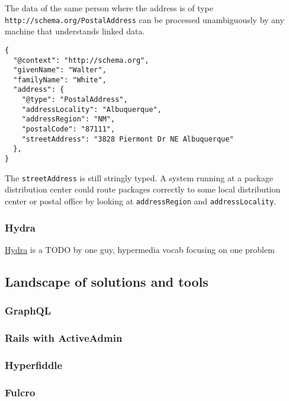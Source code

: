 The data of the same person where the address is of type \lstinline{http://schema.org/PostalAddress} can be processed unambiguously by any machine that understands linked data.

\lstset{language=JSON}
\begin{lstlisting}[caption=A person with an address of type PostalAddress]
{
  "@context": "http://schema.org",
  "givenName": "Walter",
  "familyName": "White",
  "address": {
    "@type": "PostalAddress",
    "addressLocality": "Albuquerque",
    "addressRegion": "NM",
    "postalCode": "87111",
    "streetAddress": "3828 Piermont Dr NE Albuquerque"
  },
}
\end{lstlisting}

The \lstinline{streetAddress} is still stringly typed. A system running at a package distribution center could route packages correctly to some local distribution center or postal office by looking at \lstinline{addressRegion} and \lstinline{addressLocality}.

\subsubsection{Hydra}

\href{http://www.hydra-cg.com/}{Hydra} is a
TODO by one guy, hypermedia vocab focusing on one problem

\subsection{Landscape of solutions and tools}

\subsubsection{GraphQL}
\subsubsection{Rails with ActiveAdmin}
\subsubsection{Hyperfiddle}
\subsubsection{Fulcro}
